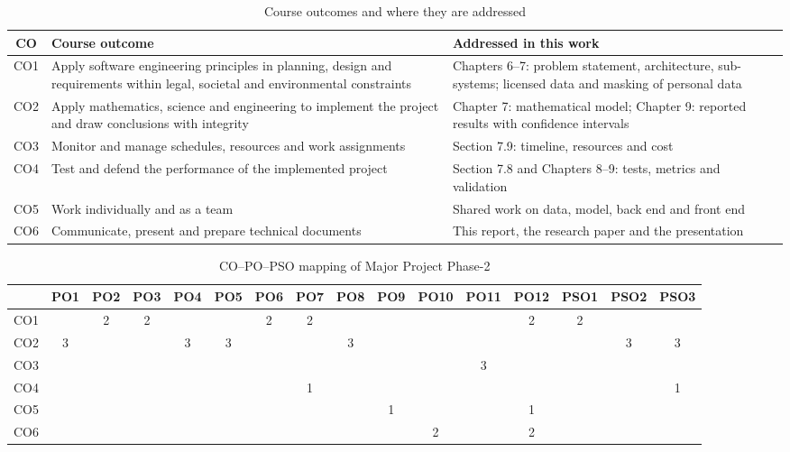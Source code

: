 \documentclass[12pt,a4paper]{report}
\begin{document}
\begin{table}[H]
\centering
\caption{Course outcomes and where they are addressed}
\label{tab:co}
\begin{tabular}{|c|L{6.6cm}|L{6.1cm}|}
\hline
\textbf{CO} & \textbf{Course outcome} & \textbf{Addressed in this work} \\
\hline
CO1 & Apply software engineering principles in planning, design and requirements within legal, societal and environmental constraints & Chapters 6--7: problem statement, architecture, sub-systems; licensed data and masking of personal data \\
\hline
CO2 & Apply mathematics, science and engineering to implement the project and draw conclusions with integrity & Chapter 7: mathematical model; Chapter 9: reported results with confidence intervals \\
\hline
CO3 & Monitor and manage schedules, resources and work assignments & Section 7.9: timeline, resources and cost \\
\hline
CO4 & Test and defend the performance of the implemented project & Section 7.8 and Chapters 8--9: tests, metrics and validation \\
\hline
CO5 & Work individually and as a team & Shared work on data, model, back end and front end \\
\hline
CO6 & Communicate, present and prepare technical documents & This report, the research paper and the presentation \\
\hline
\end{tabular}
\end{table}

\begin{table}[H]
\centering
\caption{CO--PO--PSO mapping of Major Project Phase-2}
\label{tab:copo}
\footnotesize
\setlength{\tabcolsep}{2.6pt}
\begin{tabular}{|c|c|c|c|c|c|c|c|c|c|c|c|c|c|c|c|}
\hline
 & \textbf{PO1} & \textbf{PO2} & \textbf{PO3} & \textbf{PO4} & \textbf{PO5} & \textbf{PO6} & \textbf{PO7} & \textbf{PO8} & \textbf{PO9} & \textbf{PO10} & \textbf{PO11} & \textbf{PO12} & \textbf{PSO1} & \textbf{PSO2} & \textbf{PSO3} \\
\hline
CO1 & & 2 & 2 & & & 2 & 2 & & & & & 2 & 2 & & \\
\hline
CO2 & 3 & & & 3 & 3 & & & 3 & & & & & & 3 & 3 \\
\hline
CO3 & & & & & & & & & & & 3 & & & & \\
\hline
CO4 & & & & & & & 1 & & & & & & & & 1 \\
\hline
CO5 & & & & & & & & & 1 & & & 1 & & & \\
\hline
CO6 & & & & & & & & & & 2 & & 2 & & & \\
\hline
\end{tabular}
\end{table}
\end{document}
